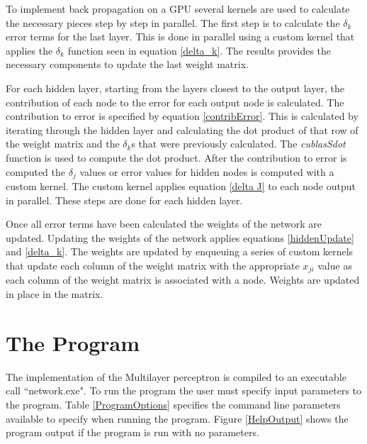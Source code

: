 \documentclass[jair, twoside,11pt,theapa]{article}
\begin{document}
To implement back propagation on a GPU several kernels are used to calculate the necessary pieces step by step in parallel. 
The first step is to calculate the $\delta_k$ error terms for the last layer.
This is done in parallel using a custom kernel that applies the $\delta_k$ function seen in equation \ref{delta_k}. 
The results provides the necessary components to update the last weight matrix. 

For each hidden layer, starting from the layers closest to the output layer, the contribution of each node to the error for each output node is calculated.
The contribution to error is specified by equation \ref{contribError}. 
This is calculated by iterating through the hidden layer and calculating the dot product of that row of the weight matrix and the $\delta_k$s that were previously calculated. 
The \textit{cublasSdot} function is used to compute the dot product. 
After the contribution to error is computed the $\delta_j$ values or error values for hidden nodes is computed with a custom kernel. 
The custom kernel applies equation \ref{delta J} to each node output in parallel. 
These steps are done for each hidden layer. 

Once all error terms have been calculated the weights of the network are updated. 
Updating the weights of the network applies equations \ref{hiddenUpdate} and \ref{delta_k}. 
The weights are updated by enqueuing a series of custom kernels that update each column of the weight matrix with the appropriate $x_{ji}$ value as each column of the weight matrix is associated with a node. 
Weights are updated in place in the matrix. 


\section{The Program}
The implementation of the Multilayer perceptron is compiled to an executable call ``network.exe". 
To run the program the user must specify input parameters to the program. 
Table \ref{ProgramOptions} specifies the command line parameters available to specify when running the program. 
Figure \ref{HelpOutput} shows the program output if the program is run with no parameters. 
\end{document}
